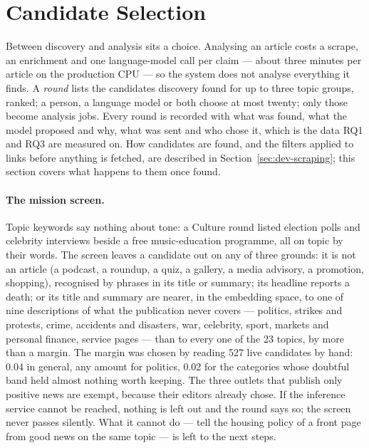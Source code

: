 
\section{Candidate Selection}
\label{sec:design-selection}

Between discovery and analysis sits a choice. Analysing an article
costs a scrape, an enrichment and one language-model call per claim ---
about three minutes per article on the production CPU --- so the
system does not analyse everything it finds. A \emph{round} lists the
candidates discovery found for up to three topic groups, ranked; a
person, a language model or both choose at most twenty; only those
become analysis jobs. Every round is recorded with what was found, what
the model proposed and why, what was sent and who chose it, which is
the data RQ1 and RQ3 are measured on. How candidates are found, and the
filters applied to links before anything is fetched, are described in
Section~\ref{sec:dev-scraping}; this section covers what happens to
them once found.

\paragraph{The mission screen.} Topic keywords say nothing about tone:
a Culture round listed election polls and celebrity interviews beside a
free music-education programme, all on topic by their words. The screen
leaves a candidate out on any of three grounds: it is not an article (a
podcast, a roundup, a quiz, a gallery, a media advisory, a promotion,
shopping), recognised by phrases in its title or summary; its headline
reports a death; or its title and summary are nearer, in the embedding
space, to one of nine descriptions of what the publication never covers
--- politics, strikes and protests, crime, accidents and disasters,
war, celebrity, sport, markets and personal finance, service pages ---
than to every one of the 23 topics, by more than a margin. The margin
was chosen by reading 527 live candidates by hand: 0.04 in general, any
amount for politics, 0.02 for the categories whose doubtful band held
almost nothing worth keeping. The three outlets that publish only
positive news are exempt, because their editors already chose. If the
inference service cannot be reached, nothing is left out and the round
says so; the screen never passes silently. What it cannot do --- tell
the housing policy of a front page from good news on the same topic ---
is left to the next steps.

